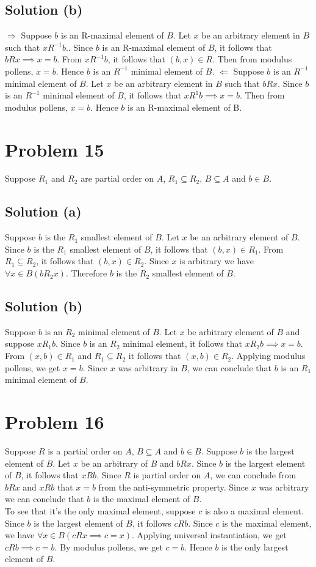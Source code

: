 \documentclass{article}
\begin{document}
\subsection{Solution (b)}
$\Rightarrow$ Suppose $b$ is an R-maximal element of $B$. Let $x$ be
an arbitrary element in $B$ such that $xR^{-1}b$.. Since $b$ is an
R-maximal element of $B$, it follows that $bRx \implies x = b$. From
$xR^{-1}b$, it follows that $(b,x) \in R$. Then from modulus pollens,
$x = b$. Hence $b$ is an $R^{-1}$ minimal element of $B$.
$\Leftarrow$ Suppose $b$ is an $R^{-1}$ minimal element of $B$. Let
$x$ be an arbitrary element in $B$ such that $bRx$. Since $b$ is an
$R^{-1}$ minimal element of $B$, it follows that $xR^{1}b \implies x =
b$. Then from modulus pollens, $x = b$. Hence $b$ is an R-maximal
element of B.

\section{Problem 15}
Suppose $R_1$ and $R_2$ are partial order on $A$, $R_1 \subseteq R_2$,
$B \subseteq A$ and $b \in B$.
\subsection{Solution (a)}
Suppose $b$ is the $R_1$ smallest element of $B$. Let $x$ be an
arbitrary element of $B$. Since $b$ is the $R_1$ smallest element of
$B$, it follows that $(b,x) \in R_1$. From $R_1 \subseteq R_2$, it
follows that $(b,x) \in R_2$. Since $x$ is arbitrary we have $\forall
x \in B(bR_2x)$. Therefore $b$ is the $R_2$ smallest element of $B$.
\subsection{Solution (b)}
Suppose $b$ is an $R_2$ minimal element of $B$. Let $x$ be arbitrary
element of $B$ and suppose $xR_1b$. Since $b$ is an $R_2$ minimal
element, it follows that $xR_2b \implies x = b$. From $(x,b) \in R_1$
and $R_1 \subseteq R_2$ it follows that $(x,b) \in R_2$. Applying
modulus pollens, we get $x = b$. Since $x$ was arbitrary in $B$, we
can conclude that $b$ is an $R_1$ minimal element of $B$.

\section{Problem 16}
Suppose $R$ is a partial order on $A$, $B \subseteq A$ and $b \in B$.
Suppose $b$ is the largest element of $B$. Let $x$ be an arbitrary of
$B$ and $bRx$. Since $b$ is the largest element of $B$, it follows that
$xRb$. Since $R$ is partial order on $A$, we can conclude from $bRx$
and $xRb$ that $x = b$ from the anti-symmetric property. Since $x$ was
arbitrary we can conclude that $b$ is the maximal element of $B$.\\
To see that it's the only maximal element, suppose $c$ is also a
maximal element. Since $b$ is the largest element of $B$, it follows
$cRb$. Since $c$ is the maximal element, we have $\forall x \in B(cRx
\implies c = x)$. Applying universal instantiation, we get $cRb
\implies c = b$. By modulus pollens, we get $c = b$. Hence $b$ is the
only largest element of $B$.
\end{document}
